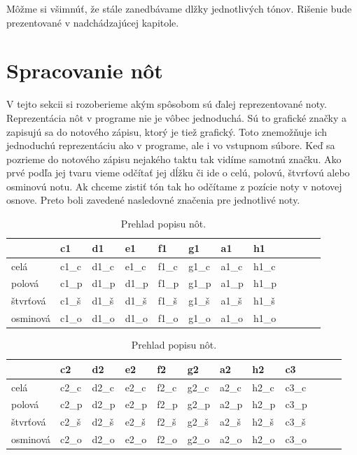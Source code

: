 Môžme si všimnúť, že stále zanedbávame dlžky jednotlivých tónov. Rišenie bude prezentované v nadchádzajúcej kapitole.

\section{Spracovanie nôt}
V tejto sekcii si rozoberieme akým spôsobom sú ďalej reprezentované noty. Reprezentácia nôt v programe nie je vôbec jednoduchá. Sú to grafické značky a zapisujú sa do notového zápisu, ktorý je tiež grafický. Toto znemožňuje ich jednoduchú reprezentáciu ako v programe, ale i vo vstupnom súbore. Keď sa pozrieme do notového zápisu nejakého taktu tak vidíme samotnú značku. Ako prvé podľa jej tvaru vieme odčítať jej dĺžku či ide o celú, polovú, štvrťovú alebo osminovú notu. Ak chceme zistiť tón tak ho odčítame z pozície noty v notovej osnove. Preto boli zavedené nasledovné značenia pre jednotlivé noty.

\begin{table}[!ht]
    \centering
    \begin{tabular}{|l|l|l|l|l|l|l|l|l|l|l|l}
    \hline
        ~ & c1 & d1 & e1 & f1 & g1 & a1 & h1 \\ \hline
        celá & c1\_c & d1\_c & e1\_c & f1\_c & g1\_c & a1\_c & h1\_c \\ \hline
        polová & c1\_p & d1\_p & d1\_p & f1\_p & g1\_p & a1\_p & h1\_p \\ \hline
        štvrťová & c1\_š & d1\_š & d1\_š & f1\_š & g1\_š & a1\_š & h1\_š \\ \hline
        osminová & c1\_o & d1\_o & d1\_o & f1\_o & g1\_o & a1\_o & h1\_o  \\ \hline
    \end{tabular}
    \caption{\label{tab:notes} Prehlad popisu nôt.}
\end{table}
\begin{table}[!ht]
    \centering
    \begin{tabular}{|l|l|l|l|l|l|l|l|l|l|l|l}
    \hline
        ~ & c2 & d2 & e2 & f2 & g2 & a2 & h2 & c3 \\ \hline
        celá & c2\_c & d2\_c & e2\_c & f2\_c & g2\_c & a2\_c & h2\_c & c3\_c \\ \hline
        polová & c2\_p & d2\_p & e2\_p & f2\_p & g2\_p & a2\_p & h2\_p & c3\_p \\ \hline
        štvrťová & c2\_š & d2\_š & e2\_š & f2\_š & g2\_š & a2\_š & h2\_š & c3\_š \\ \hline
        osminová & c2\_o & d2\_o & e2\_o & f2\_o & g2\_o & a2\_o & h2\_o & c3\_o \\ \hline
    \end{tabular}
    \caption{\label{tab:notes1} Prehlad popisu nôt.}
\end{table}

